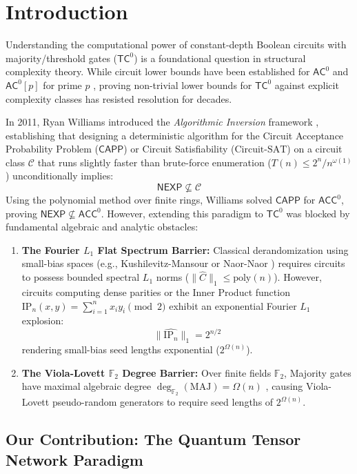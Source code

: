 \documentclass[11pt,letterpaper]{article}
\newcommand{\NEXP}{\mathsf{NEXP}}
\newcommand{\TC}{\mathsf{TC}}
\newcommand{\AC}{\mathsf{AC}}
\newcommand{\ACC}{\mathsf{ACC}}
\newcommand{\CAPP}{\mathsf{CAPP}}
\newcommand{\poly}{\mathrm{poly}}
\newcommand{\F}{\mathbb{F}}
\begin{document}
\section{Introduction}

Understanding the computational power of constant-depth Boolean circuits with majority/threshold gates ($\TC^0$) is a foundational question in structural complexity theory. While circuit lower bounds have been established for $\AC^0$ \cite{Ajt83,FSS84,Yao85,Has86} and $\AC^0[p]$ for prime $p$ \cite{Raz87,Smo87}, proving non-trivial lower bounds for $\TC^0$ against explicit complexity classes has resisted resolution for decades.

In 2011, Ryan Williams introduced the \emph{Algorithmic Inversion} framework \cite{Wil11,Wil14}, establishing that designing a deterministic algorithm for the Circuit Acceptance Probability Problem ($\CAPP$) or Circuit Satisfiability ($\text{Circuit-SAT}$) on a circuit class $\mathcal{C}$ that runs slightly faster than brute-force enumeration ($T(n) \le 2^n / n^{\omega(1)}$) unconditionally implies:
\[
\NEXP \not\subseteq \mathcal{C}
\]
Using the polynomial method over finite rings, Williams solved $\CAPP$ for $\ACC^0$, proving $\NEXP \not\subseteq \ACC^0$. However, extending this paradigm to $\TC^0$ was blocked by fundamental algebraic and analytic obstacles:
\begin{enumerate}
    \item \textbf{The Fourier $L_1$ Flat Spectrum Barrier:} Classical derandomization using small-bias spaces (e.g., Kushilevitz-Mansour \cite{KM93} or Naor-Naor \cite{NN93}) requires circuits to possess bounded spectral $L_1$ norms ($\|\widehat{C}\|_1 \le \poly(n)$). However, circuits computing dense parities or the Inner Product function $\mathrm{IP}_n(x,y) = \sum_{i=1}^n x_i y_i \pmod 2$ exhibit an exponential Fourier $L_1$ explosion:
    \[
    \|\widehat{\mathrm{IP}_n}\|_1 = 2^{n/2}
    \]
    rendering small-bias seed lengths exponential ($2^{\Omega(n)}$).
    \item \textbf{The Viola-Lovett $\F_2$ Degree Barrier:} Over finite fields $\F_2$, Majority gates have maximal algebraic degree $\deg_{\F_2}(\mathrm{MAJ}) = \Omega(n)$ \cite{Smo87}, causing Viola-Lovett pseudo-random generators \cite{Vio09,Lov09} to require seed lengths of $2^{\Omega(n)}$.
\end{enumerate}

\subsection{Our Contribution: The Quantum Tensor Network Paradigm}
\end{document}
